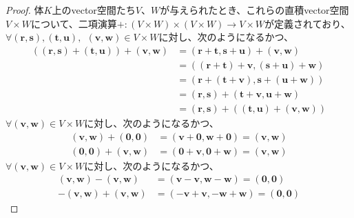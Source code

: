 \documentclass[dvipdfmx]{jsarticle}
\begin{document}
\begin{proof}
体$K$上のvector空間たち$V$、$W$が与えられたとき、これらの直積vector空間$V \times W$について、二項演算$+ :(V \times W) \times (V \times W) \rightarrow V \times W$が定義されており、$\forall\left( \mathbf{r},\mathbf{s} \right),\left( \mathbf{t},\mathbf{u} \right),\ \ \left( \mathbf{v},\mathbf{w} \right) \in V \times W$に対し、次のようになるかつ、
\begin{align*}
\left( \left( \mathbf{r},\mathbf{s} \right) + \left( \mathbf{t},\mathbf{u} \right) \right) + \left( \mathbf{v},\mathbf{w} \right) &= \left( \mathbf{r} + \mathbf{t},\mathbf{s} + \mathbf{u} \right) + \left( \mathbf{v},\mathbf{w} \right)\\
&= \left( \left( \mathbf{r} + \mathbf{t} \right) + \mathbf{v},\left( \mathbf{s} + \mathbf{u} \right) + \mathbf{w} \right)\\
&= \left( \mathbf{r} + \left( \mathbf{t} + \mathbf{v} \right),\mathbf{s} + \left( \mathbf{u} + \mathbf{w} \right) \right)\\
&= \left( \mathbf{r},\mathbf{s} \right) + \left( \mathbf{t} + \mathbf{v},\mathbf{u} + \mathbf{w} \right)\\
&= \left( \mathbf{r},\mathbf{s} \right) + \left( \left( \mathbf{t},\mathbf{u} \right) + \left( \mathbf{v},\mathbf{w} \right) \right)
\end{align*}
$\forall\left( \mathbf{v},\mathbf{w} \right) \in V \times W$に対し、次のようになるかつ、
\begin{align*}
\left( \mathbf{v},\mathbf{w} \right) + \left( \mathbf{0},\mathbf{0} \right) &= \left( \mathbf{v} + \mathbf{0},\mathbf{w} + \mathbf{0} \right) = \left( \mathbf{v},\mathbf{w} \right)\\
\left( \mathbf{0},\mathbf{0} \right) + \left( \mathbf{v},\mathbf{w} \right) &= \left( \mathbf{0} + \mathbf{v},\mathbf{0} + \mathbf{w} \right) = \left( \mathbf{v},\mathbf{w} \right)
\end{align*}
$\forall\left( \mathbf{v},\mathbf{w} \right) \in V \times W$に対し、次のようになるかつ、
\begin{align*}
\left( \mathbf{v},\mathbf{w} \right) - \left( \mathbf{v},\mathbf{w} \right) &= \left( \mathbf{v} - \mathbf{v},\mathbf{w} - \mathbf{w} \right) = \left( \mathbf{0},\mathbf{0} \right)\\
- \left( \mathbf{v},\mathbf{w} \right) + \left( \mathbf{v},\mathbf{w} \right) &= \left( - \mathbf{v} + \mathbf{v}, - \mathbf{w} + \mathbf{w} \right) = \left( \mathbf{0},\mathbf{0} \right)
\end{align*}

\end{proof}
\end{document}
